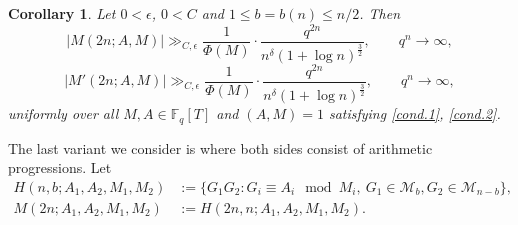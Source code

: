 \documentclass[12pt]{amsart}
\numberwithin{equation}{section}
\newtheorem{corollary}[theorem]{Corollary}
\theoremstyle{definition}
\theoremstyle{remark}
\newcommand{\FF}{\mathbb{F}}
\begin{document}
    \begin{corollary}
        Let $0 < \epsilon$, $0 < C$ and $1\leq b=b(n)\leq n/2$. Then 
        \[
            |M(2n;A,M)| \gg_{C,\epsilon} \frac{1}{\Phi(M)}\cdot \frac{q^{2n}}{n^{\delta}(1+\log n)^{\frac32}}, \qquad q^n\to \infty,
        \]
        \[
            |M'(2n;A,M)| \gg_{C,\epsilon} \frac{1}{\Phi(M)}\cdot \frac{q^{2n}}{n^{\delta}(1+\log n)^{\frac32}}, \qquad q^n\to \infty,
        \]
        uniformly over all $M,A\in \FF_q[T]$ and $(A,M)=1$ satisfying \eqref{cond.1}, \eqref{cond.2}.
    \end{corollary}

    The last variant we consider is where both sides consist of arithmetic progressions. Let
    \[
    \begin{split}
        H(n,b;A_1,A_2,M_1,M_2) &:=\{ G_1G_2: G_i\equiv A_i\mod M_i,\ G_1\in \mathcal{M}_b, G_2 \in \mathcal{M}_{n-b}\}, \\
        M(2n;A_1,A_2,M_1,M_2) &:= H(2n,n;A_1,A_2,M_1,M_2).
    \end{split}
    \]
\end{document}
